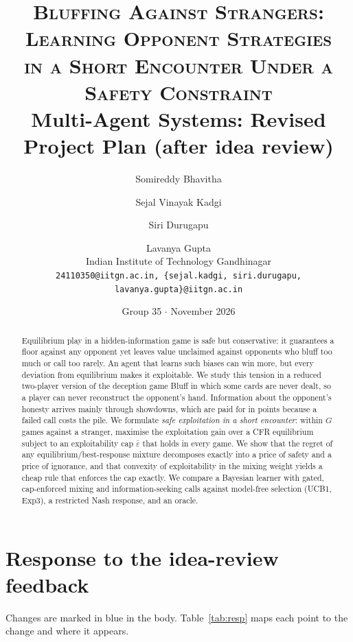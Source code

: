 \documentclass[11pt]{article}
\title{\textsc{Bluffing Against Strangers: Learning Opponent Strategies\\ in a Short Encounter Under a Safety Constraint}\\[4pt]
\large Multi-Agent Systems: Revised Project Plan (after idea review)}
\author{Somireddy Bhavitha \and Sejal Vinayak Kadgi \and Siri Durugapu \and Lavanya Gupta\\
\small Indian Institute of Technology Gandhinagar\\
\small \texttt{24110350@iitgn.ac.in, \{sejal.kadgi, siri.durugapu, lavanya.gupta\}@iitgn.ac.in}}
\date{Group 35 \quad $\cdot$ \quad November 2026}
\newcommand{\eps}{\varepsilon}
\newcommand{\epsbar}{\bar{\eps}}
\newcommand{\new}[1]{\textcolor{blue!55!black}{#1}}
\begin{document}
\maketitle
\thispagestyle{fancy}

\begin{abstract}
Equilibrium play in a hidden-information game is safe but conservative: it guarantees a floor against any opponent yet leaves value unclaimed against opponents who bluff too much or call too rarely. An agent that learns such biases can win more, but every deviation from equilibrium makes it exploitable. We study this tension in a reduced two-player version of the deception game Bluff in which \new{some cards are never dealt, so a player can never reconstruct the opponent's hand}. Information about the opponent's honesty arrives mainly through showdowns, which are \new{paid for in points} because a failed call costs the pile. We formulate \emph{safe exploitation in a short encounter}: within $G$ games against a stranger, maximise the exploitation gain over a CFR equilibrium subject to an exploitability cap $\epsbar$ \new{that holds in every game}. We show that the regret of any equilibrium/best-response mixture decomposes exactly into a price of safety and a price of ignorance, \new{and that convexity of exploitability in the mixing weight yields a cheap rule that enforces the cap exactly}. We compare a Bayesian learner with gated, cap-enforced mixing and information-seeking calls against model-free selection (UCB1, Exp3), a restricted Nash response, and an oracle.
\end{abstract}

\section*{Response to the idea-review feedback}
Changes are marked in \new{blue} in the body. Table~\ref{tab:resp} maps each point to the change and where it appears.
\end{document}
